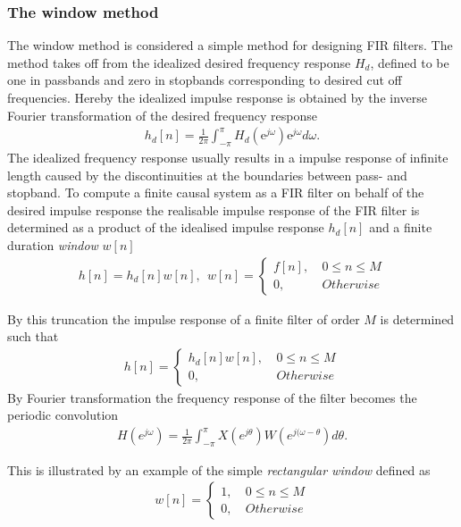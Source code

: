 \subsubsection{The window method}
The window method is considered a simple method for designing FIR filters. The method takes off from the idealized desired frequency response $H_d$, defined to be one in passbands and zero in stopbands corresponding to desired cut off frequencies. Hereby the idealized impulse response is obtained by the inverse Fourier transformation of the desired frequency response
\begin{align}
h_d[n]=\frac{1}{2\pi}\int_{-\pi}^{\pi} H_d(\text{e}^{j\omega})\text{e}^{j\omega} d\omega.
\end{align}
The idealized frequency response usually results in a impulse response of infinite length caused by the discontinuities at the boundaries between pass- and stopband. To compute a finite causal system as a FIR filter on behalf of the desired impulse response the realisable impulse response of the FIR filter is determined as a product of the idealised impulse response $h_d[n]$ and a finite duration \textit{window} $w[n]$ 
\begin{align}
h[n]=h_d[n]w[n], \ \ w[n] =
\left\{ \begin{matrix}
f[n], &\ 0 \leq n \leq M \\
0, &\ Otherwise
\end{matrix}\right.
\end{align}

By this truncation the impulse response of a finite filter of order $M$ is determined such that 
\begin{align}
h[n]= 
\left\{ \begin{matrix}
h_d[n]w[n], &\ 0 \leq n \leq M \\
0, &\ Otherwise
\end{matrix}\right.
\end{align}
By Fourier transformation the frequency response of the filter becomes the periodic convolution 
\begin{align}
H(e^{j\omega})=\frac{1}{2\pi}\int_{-\pi}^{\pi} X(e^{j\theta})W(e^{j(\omega-\theta})d\theta.
\end{align}

This is illustrated by an example of the simple \textit{rectangular window} defined as 
\begin{align}
w[n] =
\left\{ \begin{matrix}
1, &\ 0 \leq n \leq M \\
0, &\ Otherwise
\end{matrix}\right.
\end{align}


